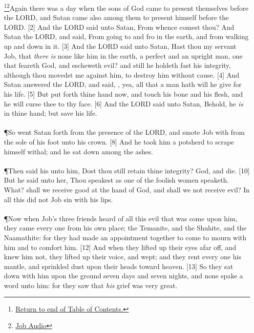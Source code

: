 \footnote{\textcolor[cmyk]{0.99998,1,0,0}{\hyperlink{TOC}{Return to end of Table of Contents.}}}\footnote{\href{https://www.audioverse.org/english/audiobibles/books/ENGKJV/O/Job/1}{\textcolor[cmyk]{0.99998,1,0,0}{Job  Audio}}}\textcolor[cmyk]{0.99998,1,0,0}{Again there was a day when the sons of God came to present themselves before the LORD, and Satan came also among them to present himself before the LORD.}
[2] \textcolor[cmyk]{0.99998,1,0,0}{And the LORD said unto Satan, From whence comest thou? And Satan  the LORD, and said, From going to and fro in the earth, and from walking up and down in it.}
[3] \textcolor[cmyk]{0.99998,1,0,0}{And the LORD said unto Satan, Hast thou  my servant Job, that \emph{there} \emph{is} none like him in the earth, a perfect and an upright man, one that feareth God, and escheweth evil? and still he holdeth fast his integrity, although thou movedst me against him, to destroy him without cause.}
[4] \textcolor[cmyk]{0.99998,1,0,0}{And Satan answered the LORD, and said, , yea, all that a man hath will he give for his life.}
[5] \textcolor[cmyk]{0.99998,1,0,0}{But put forth thine hand now, and touch his bone and his flesh, and he will curse thee to thy face.}
[6] \textcolor[cmyk]{0.99998,1,0,0}{And the LORD said unto Satan, Behold, he \emph{is} in thine hand; but save his life.}\\
\\
\P \textcolor[cmyk]{0.99998,1,0,0}{So went Satan forth from the presence of the LORD, and smote Job with  from the sole of his foot unto his crown.}
[8] \textcolor[cmyk]{0.99998,1,0,0}{And he took him a potsherd to scrape himself withal; and he sat down among the ashes.}\\
\\
\P \textcolor[cmyk]{0.99998,1,0,0}{Then said his  unto him, Dost thou still retain thine integrity?  God, and die.}
[10] \textcolor[cmyk]{0.99998,1,0,0}{But he said unto her, Thou speakest as one of the foolish women speaketh. What? shall we receive good at the hand of God, and shall we not receive evil? In all this did not Job sin with his lips.}\\
\\
\P \textcolor[cmyk]{0.99998,1,0,0}{Now when Job's three friends heard of all this evil that was come upon him, they came every one from his own place;  the Temanite, and  the Shuhite, and  the Naamathite: for they had made an appointment together to come to mourn with him and to comfort him.}
[12] \textcolor[cmyk]{0.99998,1,0,0}{And when they lifted up their eyes afar off, and knew him not, they lifted up their voice, and wept; and they rent every one his mantle, and sprinkled dust upon their heads toward heaven.}
[13] \textcolor[cmyk]{0.99998,1,0,0}{So they sat down with him upon the ground seven days and seven nights, and none spake a word unto him: for they saw that \emph{his} grief was very great.}